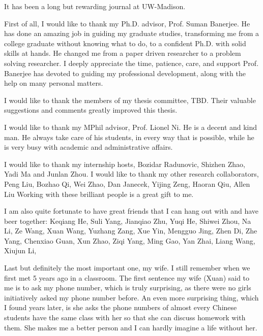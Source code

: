 \begin{acknowledgments}

It has been a long but rewarding journal at UW-Madison.

First of all, I would like to thank my Ph.D. advisor, Prof. Suman Banerjee. 
He has done an amazing job in guiding my graduate studies, transforming me
from a college graduate without knowing what to do, to a confident Ph.D. with
solid skills at hands. 
He changed me from a paper driven researcher to a problem solving researcher. 
I deeply appreciate the time, patience, care, 
and support Prof. Banerjee has devoted to guiding my professional
development, along with the help on many personal matters. 
 
I would like to thank the members of my thesis committee, TBD. 
Their valuable suggestions and comments greatly improved this thesis.
 
I would like to thank my MPhil advisor, Prof. Lionel Ni. 
He is a decent and kind man. 
He always take care of his students, in every way that is possible, 
while he is very busy with academic and administrative affairs. 


I would like to thank my internship hosts, Bozidar Radunovic, 
Shizhen Zhao, Yadi Ma and Junlan Zhou. 
I would like to thank my other research collaborators, 
Peng Liu,
Bozhao Qi,
Wei Zhao,
Dan Janecek,
Yijing Zeng,
Haoran Qiu,
Allen Liu
Working with these brilliant people is a great gift to me. 

I am also quite fortunate to have great friends that I can hang out with and have
beer together: 
Keqiang He,
Suli Yang,
Jianqiao Zhu,
Yuqi He,
Shiwei Zhou,
Na Li,
Ze Wang,
Xuan Wang,
Yuzhang Zang,
Xue Yin,
Mengguo Jing,
Zhen Di,
Zhe Yang,
Chenxiao Guan,
Xun Zhao,
Ziqi Yang,
Ming Gao,
Yan Zhai,
Liang Wang,
Xiujun Li,


Last but definitely the most important one, my wife.
I still remember when we first met 5 years ago in a classroom. 
The first sentence my wife (Xuan) said to me is to ask my phone number, 
which is truly surprising, as there were no girls initiatively asked my phone number before. 
An even more surprising thing, which I found years later, is she asks the 
phone numbers of almost every Chinese students have the same class with her 
so that she can discuss homework with them.
She makes me a better person and I can hardly imagine
a life without her. 


\end{acknowledgments}


